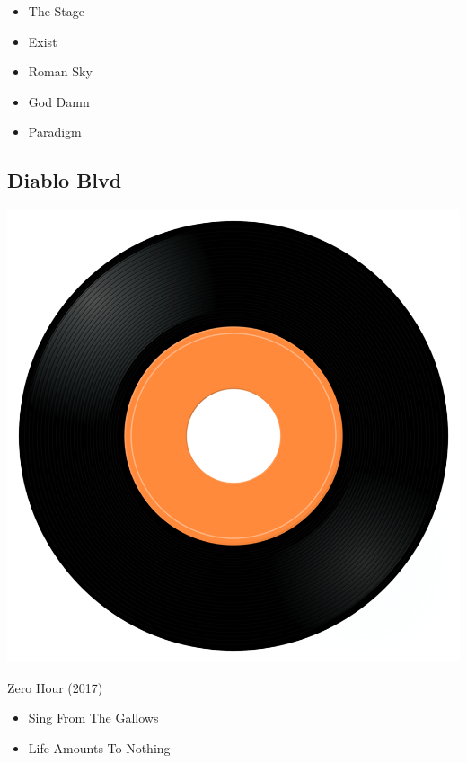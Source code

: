 \begin{minipage}[t]{0.25\textwidth}\vspace{0pt}
\begin{itemize}[nosep,leftmargin=1em,labelwidth=*,align=left]
	\setlength{\itemsep}{0pt}
	\item The Stage
	\item Exist
	\item Roman Sky
	\item God Damn
	\item Paradigm
\end{itemize}
\end{minipage}

\subsection{Diablo Blvd}

\begin{minipage}[t]{0.25\textwidth}\vspace{0pt}
\captionsetup{type=figure}
\includegraphics[width=\textwidth]{Images/cover.png}
\caption*{Zero Hour (2017)}
\end{minipage}
\begin{minipage}[t]{0.25\textwidth}\vspace{0pt}
\begin{itemize}[nosep,leftmargin=1em,labelwidth=*,align=left]
	\setlength{\itemsep}{0pt}
	\item Sing From The Gallows
	\item Life Amounts To Nothing
\end{itemize}
\end{minipage}

